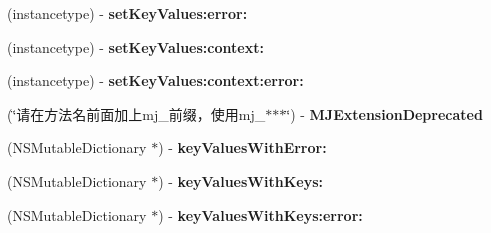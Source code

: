 \begin{DoxyCompactItemize}
\mbox{\label{category_n_s_object_07_m_j_key_value_deprecated__v__2__5__16_08_a72b875dc325817dfd48f7a55f822a9cb}} 
(instancetype) -\/ {\bfseries set\+Key\+Values\+:error\+:}
\item 
\mbox{\label{category_n_s_object_07_m_j_key_value_deprecated__v__2__5__16_08_ab16ec482aaab7c49340165d68ab5c299}} 
(instancetype) -\/ {\bfseries set\+Key\+Values\+:context\+:}
\item 
\mbox{\label{category_n_s_object_07_m_j_key_value_deprecated__v__2__5__16_08_a471180608d7720d4a810577546843d7a}} 
(instancetype) -\/ {\bfseries set\+Key\+Values\+:context\+:error\+:}
\item 
\mbox{\label{category_n_s_object_07_m_j_key_value_deprecated__v__2__5__16_08_a6da7166fe843e9d1c5173a744acbbb3f}} 
(\char`\"{}请在方法名前面加上mj\+\_\+前缀，使用mj\+\_\+$\ast$$\ast$$\ast$\char`\"{}) -\/ {\bfseries M\+J\+Extension\+Deprecated}
\item 
\mbox{\label{category_n_s_object_07_m_j_key_value_deprecated__v__2__5__16_08_aa53bf0f37329bae3c86c04194d18d057}} 
(N\+S\+Mutable\+Dictionary $\ast$) -\/ {\bfseries key\+Values\+With\+Error\+:}
\item 
\mbox{\label{category_n_s_object_07_m_j_key_value_deprecated__v__2__5__16_08_a415d6cad8e34fb8c754e81c71991924a}} 
(N\+S\+Mutable\+Dictionary $\ast$) -\/ {\bfseries key\+Values\+With\+Keys\+:}
\item 
\mbox{\label{category_n_s_object_07_m_j_key_value_deprecated__v__2__5__16_08_aebebaad332e5b843cc3d568d9762a4e3}} 
(N\+S\+Mutable\+Dictionary $\ast$) -\/ {\bfseries key\+Values\+With\+Keys\+:error\+:}
\item 
\mbox{\label{category_n_s_object_07_m_j_key_value_deprecated__v__2__5__16_08_a9d5308ad2c7c0fa8f88adf9f119bbd08}} 

\end{DoxyCompactItemize}
